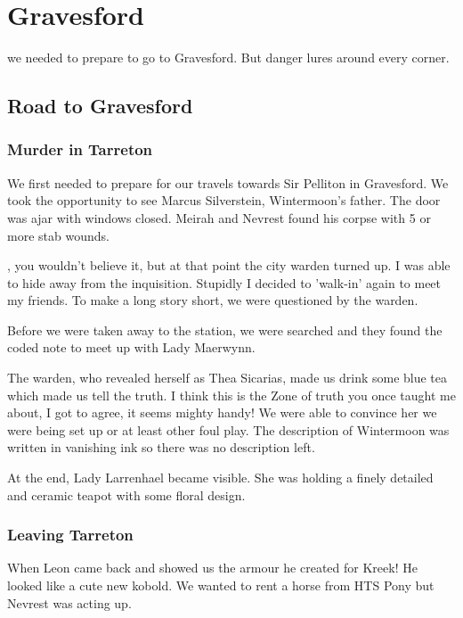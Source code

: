 \chapter{Gravesford}
\label{diary__road_to_gravesford}

 we needed to prepare to go to Gravesford. But danger lures around every corner.

\section{Road to Gravesford}
\subsection*{Murder in Tarreton}
We first needed to prepare for our travels towards Sir Pelliton in Gravesford. We took the opportunity to see Marcus Silverstein, Wintermoon's father. The door was ajar with windows closed. Meirah and Nevrest found his corpse with 5 or more stab wounds.

\Master{}, you wouldn't believe it, but at that point the city warden turned up. I was able to hide away from the inquisition. Stupidly I decided to 'walk-in' again to meet my friends. To make a long story short, we were questioned by the warden.

\begin{DndReadAloud}
    Before we were taken away to the station, we were searched and they found the coded note to meet up with Lady Maerwynn.
\end{DndReadAloud}

The warden, who revealed herself as Thea Sicarias, made us drink some blue tea which made us tell the truth. I think this is the Zone of truth you once taught me about, I got to agree, it seems mighty handy! We were able to convince her we were being set up or at least other foul play. The description of Wintermoon was written in vanishing ink so there was no description left.

At the end, Lady Larrenhael became visible. She was holding a finely detailed and ceramic teapot with some floral design.

\subsection*{Leaving Tarreton}
When Leon came back and showed us the armour he created for Kreek! He looked like a cute new kobold. We wanted to rent a horse from HTS Pony but Nevrest was acting up.

